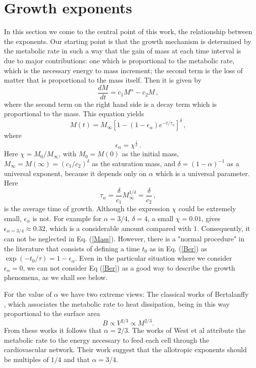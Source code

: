 \section{Growth exponents}
In this section we come to the central point of this work, the relationship between the exponents.
Our starting point is that the growth mechanism is determined by the metabolic rate in such a way that the gain of mass at each time interval is due to major contributions: one which is proportional to the metabolic rate, which is the necessary energy to mass increment; the second term is the loss of matter that is proportional to the mass itself. Then it is given by
 \begin{equation}
\frac{dM}{dt} =c_1 M^{\alpha}-c_2 M\,,
\label{dM}
\end{equation}
where the second term on the right hand side  is a decay term which is proportional to the mass.
 This equation yields
\begin{equation}
M(t) = M_\infty \left[ 1 -(1-\epsilon_{\alpha}) e^{-t/\tau_\alpha} \right]^\delta\,,
\label{Mass}
\end{equation}
where
\begin{equation}
\epsilon_{\alpha} =  \chi^{\frac{1}{\delta}}\,.
\label{epsilon}
\end{equation}
Here $\chi=M_0/M_\infty$, with $M_0=M(0)$ as the initial mass, $M_\infty = M(\infty)=(c_1/c_2)^\delta$ as the saturation mass, and  $\delta = (1-\alpha)^{-1}$ as a universal exponent, because it depends only on $\alpha$ which is a universal parameter. Here
\begin{equation}
\label{tau}
\tau_{\alpha} =  \frac{\delta}{ c_1} M_\infty^{1/\delta}= \frac{\delta}{c_2}\,,
\end{equation}
is the average time of growth.   Although the expression $\chi$ could be extremely small,
$\epsilon_\alpha$ is not. For example for $\alpha=3/4$, $\delta=4$, a small $ \chi=0.01$, gives $\epsilon_{\alpha=3/4} \approx 0.32$,  which is a considerable amount compared with $1$. Consequently, it can not be neglected in Eq. (\ref{Mass}). However, there is  a "normal procedure" in the literature that consists of defining a time $t_0$ as in Eq. (\ref{Ber}) as $\exp(-t_0/\tau)=1-\epsilon_\alpha$. Even in the particular situation where we  consider $\epsilon_{\alpha}=0$, we can not consider  Eq (\ref{Ber}) as a good way to describe the growth phenomena, as we shall see below.

For the value of $\alpha$ we have two extreme views: The classical works of  Bertalanffy  \cite{Bertalanffy38a,Bertalanffy57}, which associates the metabolic rate to heat dissipation, being in this way proportional to the surface area
\begin{equation}
B \propto V^{2/3} \propto M^{2/3}.
\end{equation}
From these works it follows that $\alpha=2/3$. The works of West et al \cite{West97,West99,Brown05} attribute the metabolic rate to the energy necessary to feed each cell through the cardiovascular network. Their work suggest that the allotropic exponents should be multiples of $1/4$ and that $\alpha=3/4$. 

